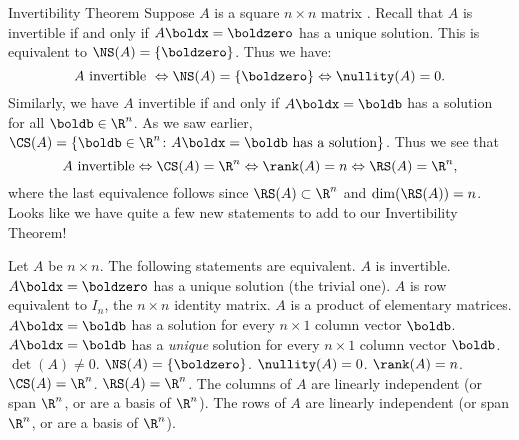 \begin{frame}{Invertibility Theorem}
\alert{Suppose $A$ is a square $n\times n$ matrix} . Recall that $A$ is invertible if and only if $A\boldx=\boldzero$ has a unique solution. This is equivalent to $\NS(A)=\{\boldzero\}$. Thus we have: 
\[
A \text{ invertible } \Leftrightarrow \NS(A)=\{\boldzero\}\Leftrightarrow \nullity(A)=0.
\]
\pause Similarly, we have $A$ invertible if and only if $A\boldx=\boldb$ has a solution \alert{for all} $\boldb\in\R^n$. As we saw earlier, $\CS(A)=\{\boldb\in\R^n\colon A\boldx=\boldb \text{ has a solution}\}$. Thus we see that 
\[
A \text{ invertible}\Leftrightarrow \CS(A)=\R^n \Leftrightarrow \rank(A)=n \Leftrightarrow \RS(A)=\R^n,
\]
where the last equivalence follows since $\RS(A)\subset\R^n$ and $\dim(\RS(A))=n$. 
\bpause 
Looks like we have quite a few new statements to add to our Invertibility Theorem! 
\end{frame}
\begin{frame}
\begin{theorem}
Let $A$ be $n\times n$. The following statements are equivalent. 
\bb[(a)]
\ii $A$ is invertible.
\ii $A\boldx=\boldzero$ has a unique solution (the trivial one). 
\ii $A$ is row equivalent to $I_n$, the $n\times n$ identity matrix.
\ii $A$ is a product of elementary matrices. 	
\ii $A\boldx=\boldb$ has a solution for every $n\times 1$ column vector $\boldb$. 
\ii $A\boldx=\boldb$ has a {\em unique} solution for every $n\times 1$ column vector $\boldb$. 
\ii $\det(A)\ne 0$.
\ii $\NS(A)=\{\boldzero\}$.
\ii $\nullity(A)=0$.
\ii $\rank(A)=n$. 
\ii $\CS(A)=\R^n$.
\ii $\RS(A)=\R^n$.
\ii The columns of $A$ are linearly independent (or span $\R^n$, or are a basis of $\R^n$).
\ii The rows of $A$ are linearly independent (or span $\R^n$, or are a basis of $\R^n$). 
\ee
\end{theorem}

\end{frame}






